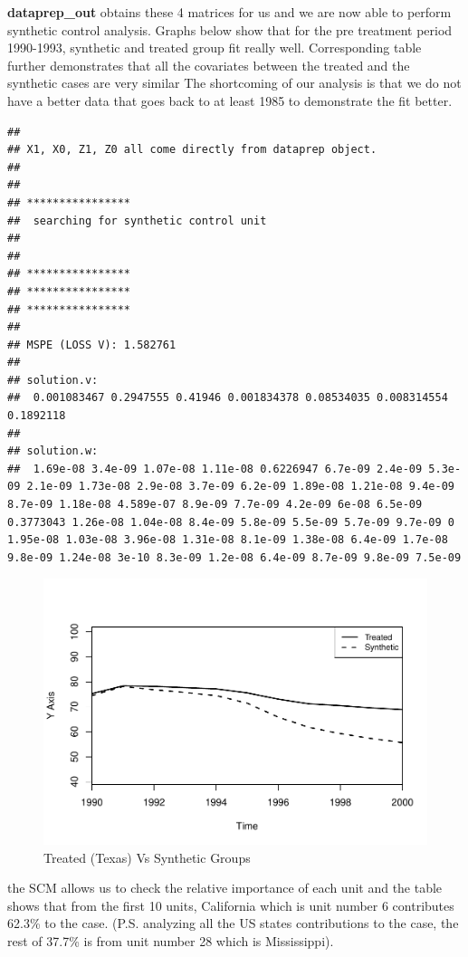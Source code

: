 \documentclass[
]{article}
\begin{document}
\textbf{dataprep\_out} obtains these 4 matrices for us and we are now
able to perform synthetic control analysis. Graphs below show that for
the pre treatment period 1990-1993, synthetic and treated group fit
really well. Corresponding table further demonstrates that all the
covariates between the treated and the synthetic cases are very similar
The shortcoming of our analysis is that we do not have a better data
that goes back to at least 1985 to demonstrate the fit better.

\begin{verbatim}
## 
## X1, X0, Z1, Z0 all come directly from dataprep object.
## 
## 
## **************** 
##  searching for synthetic control unit  
##  
## 
## **************** 
## **************** 
## **************** 
## 
## MSPE (LOSS V): 1.582761 
## 
## solution.v:
##  0.001083467 0.2947555 0.41946 0.001834378 0.08534035 0.008314554 0.1892118 
## 
## solution.w:
##  1.69e-08 3.4e-09 1.07e-08 1.11e-08 0.6226947 6.7e-09 2.4e-09 5.3e-09 2.1e-09 1.73e-08 2.9e-08 3.7e-09 6.2e-09 1.89e-08 1.21e-08 9.4e-09 8.7e-09 1.18e-08 4.589e-07 8.9e-09 7.7e-09 4.2e-09 6e-08 6.5e-09 0.3773043 1.26e-08 1.04e-08 8.4e-09 5.8e-09 5.5e-09 5.7e-09 9.7e-09 0 1.95e-08 1.03e-08 3.96e-08 1.31e-08 8.1e-09 1.38e-08 6.4e-09 1.7e-08 9.8e-09 1.24e-08 3e-10 8.3e-09 1.2e-08 6.4e-09 8.7e-09 9.8e-09 7.5e-09
\end{verbatim}

\begin{figure}
\centering
\includegraphics{causal_Inf_final2_files/figure-latex/unnamed-chunk-3-1.pdf}
\caption{Treated (Texas) Vs Synthetic Groups}
\end{figure}

the SCM allows us to check the relative importance of each unit and the
table shows that from the first 10 units, California which is unit
number 6 contributes 62.3\% to the case. (P.S. analyzing all the US
states contributions to the case, the rest of 37.7\% is from unit number
28 which is Mississippi).
\end{document}
